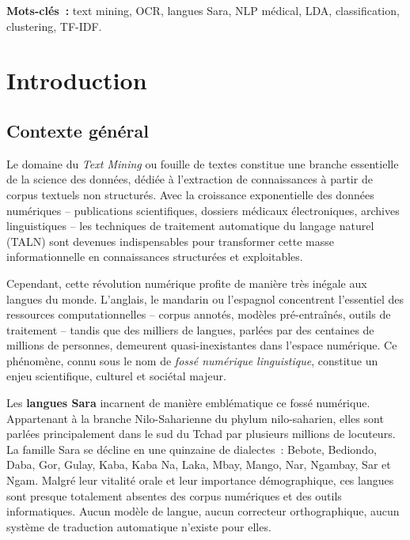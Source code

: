 \documentclass[11pt, a4paper, oneside]{article}
\begin{document}
\medskip
\textbf{Mots-clés~:} text mining, OCR, langues Sara, NLP médical, LDA, classification, clustering, TF-IDF.

\newpage
\tableofcontents
\newpage

\section{Introduction}

\subsection{Contexte général}

Le domaine du \emph{Text Mining} ou fouille de textes constitue une branche essentielle de la science des données, dédiée à l'extraction de connaissances à partir de corpus textuels non structurés. Avec la croissance exponentielle des données numériques -- publications scientifiques, dossiers médicaux électroniques, archives linguistiques -- les techniques de traitement automatique du langage naturel (TALN) sont devenues indispensables pour transformer cette masse informationnelle en connaissances structurées et exploitables.

Cependant, cette révolution numérique profite de manière très inégale aux langues du monde. L'anglais, le mandarin ou l'espagnol concentrent l'essentiel des ressources computationnelles -- corpus annotés, modèles pré-entraînés, outils de traitement -- tandis que des milliers de langues, parlées par des centaines de millions de personnes, demeurent quasi-inexistantes dans l'espace numérique. Ce phénomène, connu sous le nom de \emph{fossé numérique linguistique}, constitue un enjeu scientifique, culturel et sociétal majeur.

Les \textbf{langues Sara} incarnent de manière emblématique ce fossé numérique. Appartenant à la branche Nilo-Saharienne du phylum nilo-saharien, elles sont parlées principalement dans le sud du Tchad par plusieurs millions de locuteurs. La famille Sara se décline en une quinzaine de dialectes~: Bebote, Bediondo, Daba, Gor, Gulay, Kaba, Kaba Na, Laka, Mbay, Mango, Nar, Ngambay, Sar et Ngam. Malgré leur vitalité orale et leur importance démographique, ces langues sont presque totalement absentes des corpus numériques et des outils informatiques. Aucun modèle de langue, aucun correcteur orthographique, aucun système de traduction automatique n'existe pour elles.
\end{document}

